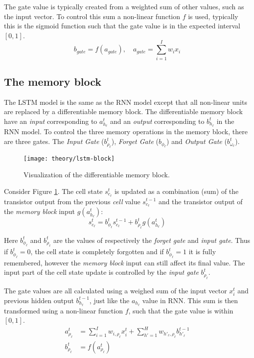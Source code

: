 The gate value is typically created from a weighted sum of other values, such as the input vector. To control this sum a non-linear function $f$ is used, typically this is the sigmoid function such that the gate value is in the expected interval $[0, 1]$.
\begin{equation}
b_{gate} = f(a_{gate}), \quad a_{gate} = \sum_{i=1}^I w_i x_i
\end{equation}

\subsection{The memory block}

The LSTM model is the same as the RNN model except that all non-linear units are replaced by a differentiable memory block. The differentiable memory block have an \textit{input} corresponding to $a_{h_\ell}^t$ and an \textit{output} corresponding to $b_{h_\ell}^t$ in the RNN model. To control the three memory operations in the memory block, there are three gates. The \textit{Input Gate} ($b_{\rho_\ell}^t$), \textit{Forget Gate} ($b_{\phi_\ell}$) and \textit{Output Gate} ($b_{\omega_\ell}^t$).

\begin{figure}[h]
	\centering
	\texttt{[image: theory/lstm-block]}
	\caption{Visualization of the differentiable memory block.}
	\label{fig:theory:lstm:lstm-block}
\end{figure}

Consider Figure \ref{fig:theory:lstm:lstm-block}. The cell state $s_{c_\ell}^t$ is updated as a combination (sum) of the transistor output from the previous \textit{cell} value $s_{c_\ell}^{t-1}$ and the transistor output of the \textit{memory block} input $g(a_{h_\ell}^t)$:
\begin{equation}
s_{c_\ell}^t = b_{\phi_\ell}^t s_{c_\ell}^{t-1} + b_{\rho_\ell}^t g(a_{h_\ell}^t)
\end{equation}

Here $b_{\phi_\ell}^t$ and $b_{\rho_\ell}^t$ are the values of respectively the \textit{forget gate} and \textit{input gate}. Thus if $b_{\phi_\ell}^t = 0$, the cell state is completely forgotten and if $b_{\phi_\ell}^t = 1$ it is fully remembered, however the \textit{memory block} input can still affect its final value. The input part of the cell state update is controlled by the \textit{input gate} $b_{\rho_\ell}^t$. 

The gate values are all calculated using a weighed sum of the input vector $x_i^t$ and previous hidden output $b_{h_\ell}^{t-1}$, just like the $a_{h_\ell}$ value in RNN. This sum is then transformed using a non-linear function $f$, such that the gate value is within $[0, 1]$.
\begin{equation}
\begin{aligned}
a_{\rho_\ell}^t &= \sum_{i=1}^I w_{i, \rho_\ell} x_i^t + \sum_{h'=1}^H w_{h'_\ell, \rho_\ell} b_{h'_\ell}^{t-1} \\
b_{\rho_\ell}^t &= f(a_{\rho_\ell}^t)
\end{aligned}
\label{eq:theory:lstm:gate-value-example}
\end{equation}


